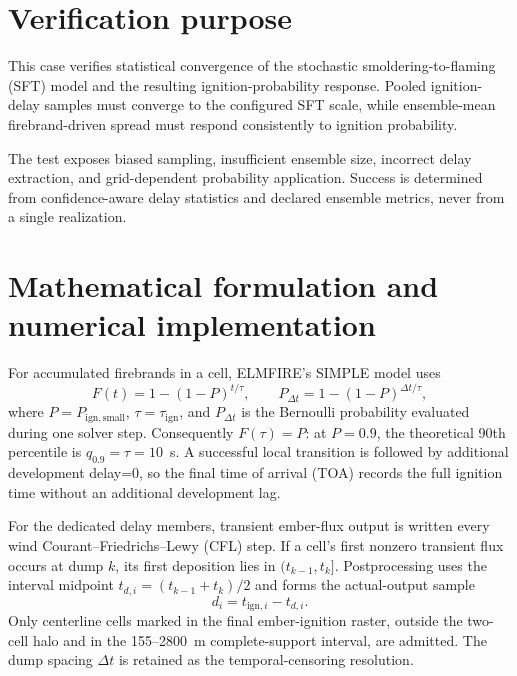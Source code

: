 \section{Verification purpose}

This case verifies statistical convergence of the stochastic smoldering-to-flaming (SFT) model and the resulting ignition-probability response. Pooled ignition-delay samples must converge to the configured SFT scale, while ensemble-mean firebrand-driven spread must respond consistently to ignition probability.

The test exposes biased sampling, insufficient ensemble size, incorrect delay extraction, and grid-dependent probability application. Success is determined from confidence-aware delay statistics and declared ensemble metrics, never from a single realization.

\section{Mathematical formulation and numerical implementation}
For accumulated firebrands in a cell, ELMFIRE's SIMPLE model uses
\begin{equation}
 F(t)=1-(1-P)^{t/\tau}, \qquad
 P_{\Delta t}=1-(1-P)^{\Delta t/\tau},
 \label{eq:cdf}
\end{equation}
where $P=P_{\mathrm{ign,small}}$, $\tau=\tau_{\mathrm{ign}}$, and
$P_{\Delta t}$ is the Bernoulli probability evaluated during one solver step.
Consequently $F(\tau)=P$: at $P=0.9$, the theoretical 90th percentile is
$q_{0.9}=\tau=10$~s. A successful local transition is followed by
additional development delay=0, so the final time of arrival (TOA) records the full ignition
time without an additional development lag.

For the dedicated delay members, transient ember-flux output is written every
wind Courant--Friedrichs--Lewy (CFL) step. If a cell's first nonzero transient flux occurs at dump $k$, its
first deposition lies in $(t_{k-1},t_k]$. Postprocessing uses the interval
midpoint $t_{d,i}=(t_{k-1}+t_k)/2$ and forms the actual-output sample
\begin{equation}
 d_i=t_{\mathrm{ign},i}-t_{d,i}.
 \label{eq:delay}
\end{equation}
Only centerline cells marked in the final ember-ignition raster, outside the
two-cell halo and in the 155--2800~m complete-support interval, are admitted.
The dump spacing $\Delta t$ is retained as the temporal-censoring resolution.

